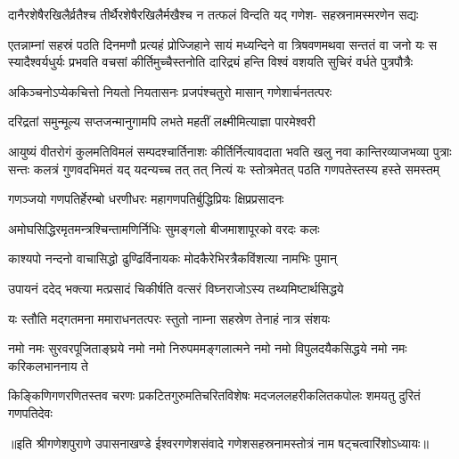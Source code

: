 \fourlineindentedshloka
{दानैरशेषैरखिलैर्व्रतैश्च}
{तीर्थैरशेषैरखिलैर्मखैश्च}
{न तत्फलं विन्दति यद् गणेश-}
{सहस्रनामस्मरणेन सद्यः}%

\fourlineindentedshloka
{एतन्नाम्नां सहस्रं पठति दिनमणौ प्रत्यहं प्रोज्जिहाने}
{सायं मध्यन्दिने वा त्रिषवणमथवा सन्ततं वा जनो यः}
{स स्यादैश्वर्यधुर्यः प्रभवति वचसां कीर्तिमुच्चैस्तनोति}
{दारिद्र्यं हन्ति विश्वं वशयति सुचिरं वर्धते पुत्रपौत्रैः}%

\twolineshloka
{अकिञ्चनोऽप्येकचित्तो नियतो नियतासनः}
{प्रजपंश्चतुरो मासान् गणेशार्चनतत्परः}%

\twolineshloka
{दरिद्रतां समुन्मूल्य सप्तजन्मानुगामपि}
{लभते महतीं लक्ष्मीमित्याज्ञा पारमेश्वरी}%

\fourlineindentedshloka
{आयुष्यं वीतरोगं कुलमतिविमलं सम्पदश्चार्तिनाशः}
{कीर्तिर्नित्यावदाता भवति खलु नवा कान्तिरव्याजभव्या}
{पुत्राः सन्तः कलत्रं गुणवदभिमतं यद् यदन्यच्च तत् तत्}
{नित्यं यः स्तोत्रमेतत् पठति गणपतेस्तस्य हस्ते समस्तम्}%

\twolineshloka
{गणञ्जयो गणपतिर्हेरम्बो धरणीधरः}
{महागणपतिर्बुद्धिप्रियः क्षिप्रप्रसादनः}%

\twolineshloka
{अमोघसिद्धिरमृतमन्त्रश्चिन्तामणिर्निधिः}
{सुमङ्गलो बीजमाशापूरको वरदः कलः}%

\twolineshloka
{काश्यपो नन्दनो वाचासिद्धो ढुण्ढिर्विनायकः}
{मोदकैरेभिरत्रैकविंशत्या नामभिः पुमान्}%

\twolineshloka
{उपायनं ददेद् भक्त्या मत्प्रसादं चिकीर्षति}
{वत्सरं विघ्नराजोऽस्य तथ्यमिष्टार्थसिद्धये}%

\twolineshloka
{यः स्तौति मद्गतमना ममाराधनतत्परः}
{स्तुतो नाम्ना सहस्रेण तेनाहं नात्र संशयः}%

\fourlineindentedshloka
{नमो नमः सुरवरपूजिताङ्घ्रये}
{नमो नमो निरुपममङ्गलात्मने}
{नमो नमो विपुलदयैकसिद्धये}
{नमो नमः करिकलभाननाय ते}%

\fourlineindentedshloka
{किङ्किणिगणरणितस्तव चरणः}
{प्रकटितगुरुमतिचरितविशेषः}
{मदजललहरीकलितकपोलः}
{शमयतु दुरितं गणपतिदेवः}%

{॥इति श्रीगणेशपुराणे उपासनाखण्डे ईश्वरगणेशसंवादे गणेशसहस्रनामस्तोत्रं नाम षट्चत्वारिंशोऽध्यायः॥}